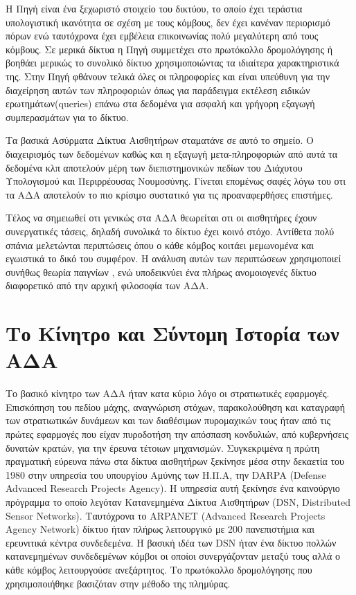 Η Πηγή είναι ένα ξεχωριστό στοιχείο του δικτύου, το οποίο έχει τεράστια υπολογιστική ικανότητα σε σχέση με τους κόμβους, δεν έχει κανέναν περιορισμό πόρων ενώ
ταυτόχρονα έχει εμβέλεια επικοινωνίας
πολύ μεγαλύτερη από τους κόμβους.
Σε μερικά δίκτυα η Πηγή συμμετέχει στο πρωτόκολλο δρομολόγησης ή βοηθάει μερικώς το συνολικό δίκτυο χρησιμοποιώντας τα ιδιαίτερα χαρακτηριστικά της.
Στην Πηγή φθάνουν τελικά όλες οι πληροφορίες και είναι υπεύθυνη για την διαχείρηση αυτών των πληροφοριών όπως για παράδειγμα εκτέλεση ειδικών
ερωτημάτων(queries) επάνω στα δεδομένα για ασφαλή και γρήγορη εξαγωγή συμπερασμάτων για το δίκτυο.

Τα βασικά Ασύρματα Δίκτυα Αισθητήρων σταματάνε σε αυτό το σημείο.
Ο διαχειρισμός των δεδομένων καθώς και η εξαγωγή μετα-πληροφοριών από αυτά τα δεδομένα κλπ αποτελούν μέρη των διεπιστημονικών πεδίων του Διάχυτου Υπολογισμού και
Περιρρέουσας Νουμοσύνης.
Γίνεται επομένως σαφές λόγω του οτι τα ΑΔΑ αποτελούν το πιο κρίσιμο συστατικό για τις προαναφερθήσες επιστήμες.

Τέλος να σημειωθεί οτι γενικώς στα ΑΔΑ θεωρείται οτι οι αισθητήρες έχουν συνεργατικές τάσεις, δηλαδή συνολικά το δίκτυο έχει κοινό στόχο.
Αντίθετα πολύ σπάνια μελετώνται περιπτώσεις όπου ο κάθε κόμβος κοιτάει μεμωνομένα και εγωιστικά το δικό του συμφέρον.
Η ανάλυση αυτών των περιπτώσεων χρησιμοποιεί συνήθως θεωρία παιγνίων \cite{game_theroy_sensor}, ενώ υποδεικνύει ένα πλήρως ανομοιογενές δίκτυο διαφορετικό από την
αρχική φιλοσοφία των ΑΔΑ.

\section{Το Κίνητρο και Σύντομη Ιστορία των ΑΔΑ} \label{sec:history}
Το βασικό κίνητρο των ΑΔΑ ήταν κατα κύριο λόγο οι στρατιωτικές εφαρμογές.
Επισκόπηση του πεδίου μάχης, αναγνώριση στόχων, παρακολούθηση και καταγραφή των στρατιωτικών δυνάμεων και των διαθέσιμων πυρομαχικών τους ήταν από τις πρώτες
εφαρμογές που είχαν πυροδοτήση την απόσπαση κονδυλιών, από κυβερνήσεις δυνατών κρατών, για την έρευνα τέτοιων μηχανισμών.
Συγκεκριμένα η πρώτη πραγματική εύρευνα πάνω στα δίκτυα αισθητήρων ξεκίνησε μέσα στην δεκαετία του 1980 στην υπηρεσία του υπουργίου Αμύνης των Η.Π.Α, την DARPA
(Defense Advanced Research Projects Agency).
Η υπηρεσία αυτή ξεκίνησε ένα καινούργιο πρόγραμμα το οποίο λεγόταν Κατανεμημένα Δίκτυα Αισθητήρων (DSN, Distributed Sensor Networks).
Ταυτόχρονα το ARPANET (Advanced Research Projects Agency Network) δίκτυο ήταν πλήρως λειτουργικό με 200 πανεπιστήμια και ερευνιτικά κέντρα συνδεδεμένα.
Η βασική ιδέα των DSN ήταν ένα δίκτυο πολλών κατανεμημένων συνδεδεμένων κόμβοι οι οποίοι συνεργάζονταν μεταξύ τους αλλά ο κάθε κόμβος λειτουργούσε ανεξάρτητος.
Το πρωτόκολλο δρομολόγησης που χρησιμοποιήθηκε βασιζόταν στην μέθοδο της πλημύρας.

